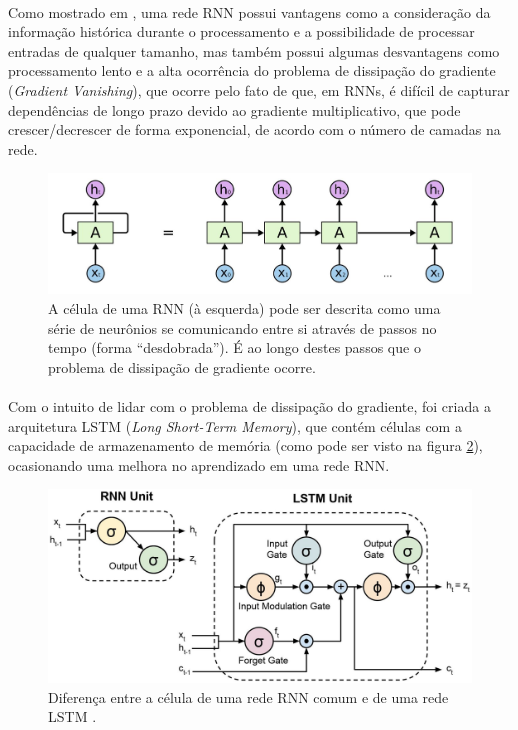 \documentclass[grad,numbers]{coppe}
\begin{document}
	  	\paragraph{}Como mostrado em \cite{rnn-cheatsheet}, uma rede RNN possui vantagens como a consideração da informação histórica durante o processamento e a possibilidade de processar entradas de qualquer tamanho, mas também possui algumas desvantagens como processamento lento e a alta ocorrência do problema de dissipação do gradiente (\textit{Gradient Vanishing}), que ocorre pelo fato de que, em RNNs, é difícil de capturar dependências de longo prazo devido ao gradiente multiplicativo, que pode crescer/decrescer de forma exponencial, de acordo com o número de camadas na rede.
	  	\begin{figure}[h]
	  		\centering
	  		\includegraphics[width=13cm]{rnn-cell.jpg}
	  		\caption{A célula de uma RNN (à esquerda) pode ser descrita como uma série de neurônios se comunicando entre si através de passos no tempo (forma ``desdobrada'')\cite{understanding-lstm}. É ao longo destes passos que o problema de dissipação de gradiente ocorre.}
	  		\label{fig:rnn-cell-fig}
	  	\end{figure}
	  	\paragraph{}Com o intuito de lidar com o problema de dissipação do gradiente, foi criada a arquitetura LSTM (\textit{Long Short-Term Memory})\cite{lstm-paper}, que contém células com a capacidade de armazenamento de memória (como pode ser visto na figura \ref{fig:lstm_rnn_comparisson-fig}), ocasionando uma melhora no aprendizado em uma rede RNN.
	  	\begin{figure}[H]
	  		\centering
	  		\includegraphics[width=12cm]{lstm_rnn_comparisson.jpg}
	  		\caption{Diferença entre a célula de uma rede RNN comum e de uma rede LSTM \cite{lstm-visual}.}
	  		\label{fig:lstm_rnn_comparisson-fig}
	  	\end{figure}
\end{document}
